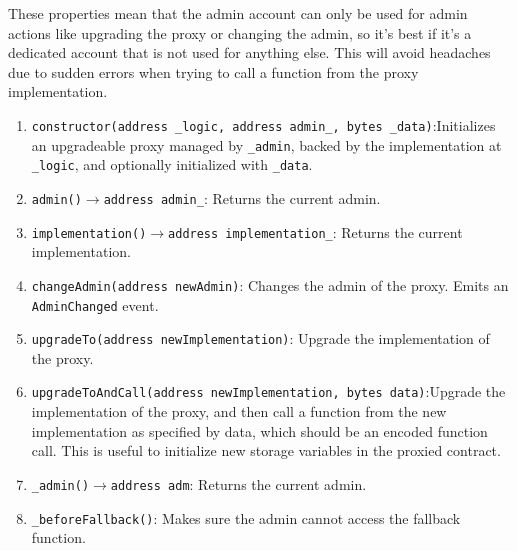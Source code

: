 \begin{enumerate}
These properties mean that the admin account can only be used for admin actions like upgrading the proxy or changing the admin, so it’s best if it’s a dedicated account that is not used for anything else. This will avoid headaches due to sudden errors when trying to call a function from the proxy implementation.
    \begin{enumerate}
    \item\verb|constructor(address _logic, address admin_, bytes _data)|:\linebreak Initializes an upgradeable proxy managed by \verb|_admin|, backed by the implementation at \verb|_logic|, and optionally initialized with \verb|_data|.
    \item\verb|admin()|$\rightarrow$\verb|address admin_|: Returns the current admin.
    \item\verb|implementation()|$\rightarrow$\verb|address implementation_|: Returns the current implementation.
    \item\verb|changeAdmin(address newAdmin)|: Changes the admin of the proxy. Emits an \verb|AdminChanged| event.
    \item\verb|upgradeTo(address newImplementation)|: Upgrade the implementation of the proxy.
    \item\verb|upgradeToAndCall(address newImplementation, bytes data)|:\linebreak Upgrade the implementation of the proxy, and then call a function from the new implementation as specified by data, which should be an encoded function call. This is useful to initialize new storage variables in the proxied contract.
    \item\verb|_admin()|$\rightarrow$\verb|address adm|: Returns the current admin.
    \item\verb|_beforeFallback()|: Makes sure the admin cannot access the fallback function.
    \end{enumerate}


\end{enumerate}
